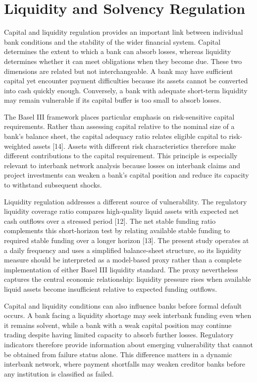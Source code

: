 \section{Liquidity and Solvency Regulation}

Capital and liquidity regulation provides an important link between
individual bank conditions and the stability of the wider financial
system. Capital determines the extent to which a bank can absorb losses,
whereas liquidity determines whether it can meet obligations when they
become due. These two dimensions are related but not interchangeable. A
bank may have sufficient capital yet encounter payment difficulties
because its assets cannot be converted into cash quickly enough.
Conversely, a bank with adequate short-term liquidity may remain
vulnerable if its capital buffer is too small to absorb losses.

The Basel III framework places particular emphasis on risk-sensitive
capital requirements. Rather than assessing capital relative to the
nominal size of a bank's balance sheet, the capital adequacy ratio
relates eligible capital to risk-weighted assets {[}14{]}. Assets with
different risk characteristics therefore make different contributions to
the capital requirement. This principle is especially relevant to
interbank network analysis because losses on interbank claims and
project investments can weaken a bank's capital position and reduce its
capacity to withstand subsequent shocks.

Liquidity regulation addresses a different source of vulnerability. The
regulatory liquidity coverage ratio compares high-quality liquid assets
with expected net cash outflows over a stressed period {[}12{]}. The net
stable funding ratio complements this short-horizon test by relating
available stable funding to required stable funding over a longer
horizon {[}13{]}. The present study operates at a daily frequency and
uses a simplified balance-sheet structure, so its liquidity measure
should be interpreted as a model-based proxy rather than a complete
implementation of either Basel III liquidity standard. The proxy
nevertheless captures the central economic relationship: liquidity
pressure rises when available liquid assets become insufficient relative
to expected funding outflows.

Capital and liquidity conditions can also influence banks before formal
default occurs. A bank facing a liquidity shortage may seek interbank
funding even when it remains solvent, while a bank with a weak capital
position may continue trading despite having limited capacity to absorb
further losses. Regulatory indicators therefore provide information
about emerging vulnerability that cannot be obtained from failure status
alone. This difference matters in a dynamic interbank network,
where payment shortfalls may weaken creditor banks before any
institution is classified as failed.

